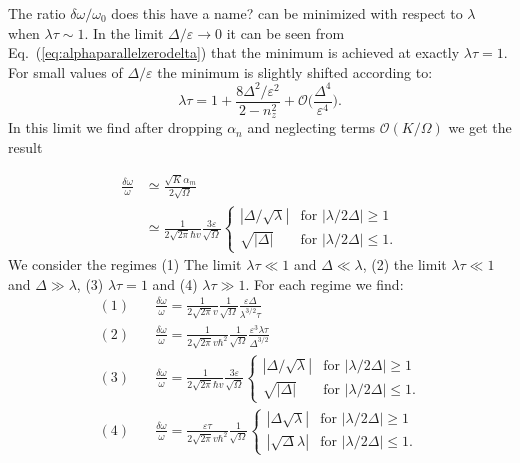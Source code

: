 The ratio $\delta\omega/\omega_0$ {\color{blue} does this have a name?} can be minimized with respect to $\lambda$ when $\lambda\tau\sim1$. In the limit $\Delta/\varepsilon\rightarrow0$ it can be seen from Eq.~(\ref{eq:alphaparallelzerodelta}) that the minimum is achieved at exactly $\lambda\tau=1$. For small values of $\Delta/\varepsilon$ the minimum is slightly shifted according to:
\begin{equation}
    \lambda\tau = 1 + \frac{8\Delta^2/\varepsilon^2}{2-n_z^2}+\mathcal{O}\Big(\frac{\Delta^4}{\varepsilon^4}\Big).
\end{equation}
In this limit we find after dropping $\alpha_n$ and neglecting terms $\mathcal{O}(K/\Omega)$ we get the result

\begin{align}
    \frac{\delta\omega}{\omega} &\simeq \frac{\sqrt{K}\alpha_m}{2\sqrt{\Omega}}\nonumber\\
    &\simeq\frac{1}{2\sqrt{2\pi}\hbar v}\frac{3\varepsilon}{\sqrt{\Omega}} \begin{cases}
    |\Delta/\sqrt{\lambda}| & \text{for } |\lambda/2\Delta| \geq 1 \\
    \sqrt{|\Delta|} & \text{for } |\lambda/2\Delta| \leq 1.
    \end{cases}
    \label{eq:freq}
\end{align}
We consider the regimes (1) The limit $\lambda\tau\ll1$ and $\Delta\ll\lambda$, (2) the limit $\lambda\tau\ll1$ and $\Delta\gg\lambda$, (3) $\lambda\tau=1$ and (4) $\lambda\tau\gg1$. For each regime we find:
\begin{align}
    (1)&\quad \frac{\delta\omega}{\omega}= \frac{1}{2\sqrt{2\pi} v}\frac{1}{\sqrt{\Omega}}\frac{\varepsilon\Delta}{\lambda^{3/2}\tau}\\
    (2)&\quad \frac{\delta\omega}{\omega}= \frac{1}{2\sqrt{2\pi} v\hbar^2}\frac{1}{\sqrt{\Omega}}\frac{\varepsilon^3\lambda\tau}{\Delta^{3/2}}\\
    (3)&\quad \frac{\delta\omega}{\omega}= \frac{1}{2\sqrt{2\pi}\hbar v}\frac{3\varepsilon}{\sqrt{\Omega}} \begin{cases}
    |\Delta/\sqrt{\lambda}| & \text{for } |\lambda/2\Delta| \geq 1 \\
    \sqrt{|\Delta|} & \text{for } |\lambda/2\Delta| \leq 1.
    \end{cases}\\
    (4)&\quad \frac{\delta\omega}{\omega}= \frac{\varepsilon\tau}{2\sqrt{2\pi} v\hbar^2}\frac{1}{\sqrt{\Omega}}
    \begin{cases}
    |\Delta\sqrt{\lambda}| & \text{for } |\lambda/2\Delta| \geq 1 \\
    |\sqrt{\Delta}\lambda| & \text{for } |\lambda/2\Delta| \leq 1.
    \end{cases} 
\end{align}
